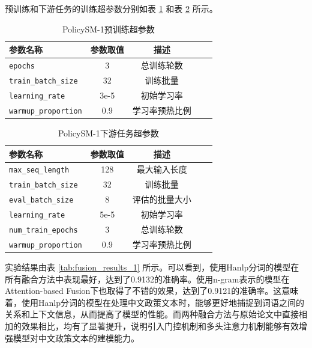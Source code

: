 \documentclass[12pt, a4paper]{ctexart}
\begin{document}
预训练和下游任务的训练超参数分别如表 \ref{tab:pretrain_hyperparameters_1} 和表 \ref{tab:seqlevel_hyperparameters_1} 所示。


\begin{table}[H]
    \renewcommand{\arraystretch}{1}
    \centering
    \caption{PolicySM-1预训练超参数}
    \begin{tabular}{lcccc}
        \toprule
        \textbf{参数名称} & \textbf{参数取值} & \textbf{描述} \\
        \midrule
        \texttt{epochs} & 3 & 总训练轮数 \\ 
        \texttt{train\_batch\_size} & 32 & 训练批量 \\
        \texttt{learning\_rate} & 3e-5 & 初始学习率 \\ 
        \texttt{warmup\_proportion} & 0.9 & 学习率预热比例 \\ 
        \bottomrule
    \end{tabular}
    \label{tab:pretrain_hyperparameters_1}
\end{table}

\begin{table}[H]
    \renewcommand{\arraystretch}{1}
    \centering
    \caption{PolicySM-1下游任务超参数}
    \begin{tabular}{lcccc}
        \toprule
        \textbf{参数名称} & \textbf{参数取值} & \textbf{描述} \\ 
        \midrule
        \texttt{max\_seq\_length} & 128 & 最大输入长度\\ 
        \texttt{train\_batch\_size} & 32 & 训练批量 \\ 
        \texttt{eval\_batch\_size} & 8 & 评估的批量大小 \\
        \texttt{learning\_rate} & 5e-5 & 初始学习率 \\
        \texttt{num\_train\_epochs} & 3 & 总训练轮数 \\ 
        \texttt{warmup\_proportion} & 0.9 & 学习率预热比例 \\
        \bottomrule
    \end{tabular}
    \label{tab:seqlevel_hyperparameters_1}
\end{table}

实验结果由表 \ref{tab:fusion_results_1} 所示。可以看到，使用Hanlp分词的模型在所有融合方法中表现最好，达到了0.9132的准确率。使用n-gram表示的模型在Attention-based Fusion下也取得了不错的效果，达到了0.9121的准确率。这意味着，使用Hanlp分词的模型在处理中文政策文本时，能够更好地捕捉到词语之间的关系和上下文信息，从而提高了模型的性能。而两种融合方法与原始论文中直接相加的效果相比，均有了显著提升，说明引入门控机制和多头注意力机制能够有效增强模型对中文政策文本的建模能力。
\end{document}
